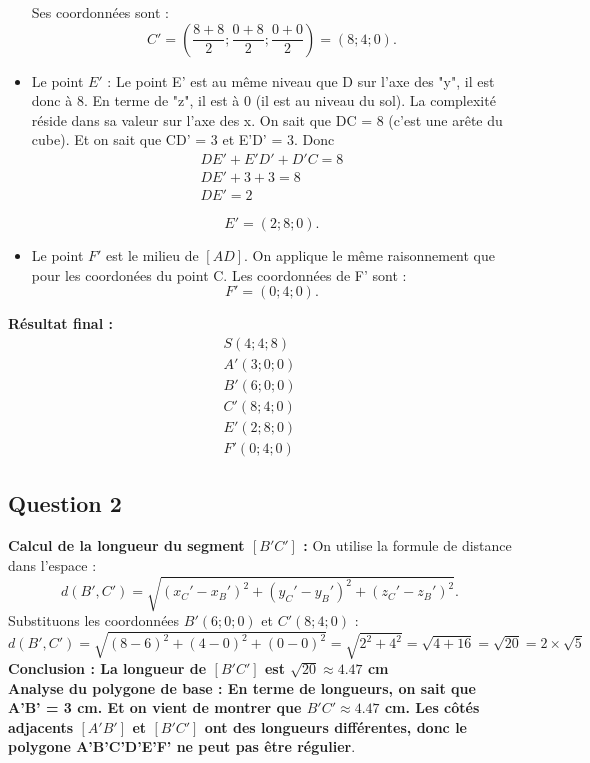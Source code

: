 \documentclass{exam}
\begin{document}
\begin{itemize}[noitemsep]
  Ses coordonnées sont :
  \[
  C' = \left(\frac{8 + 8}{2}; \frac{0 + 8}{2}; \frac{0 + 0}{2}\right) = (8; 4; 0).
  \]

  \item Le point \(E'\) : Le point E' est au même niveau que D sur l'axe des "y", il est donc à 8. En terme de "z", il est à 0 (il est au niveau du sol). La complexité réside dans sa valeur sur l'axe des x. On sait que DC = 8 (c'est une arête du cube). Et on sait que CD' = 3 et E'D' = 3.
  Donc
  \begin{align*}
    DE' + E'D' + D'C = 8 \\
    DE' + 3 + 3 = 8 \\
    DE' = 2
    \end{align*} 

  \[
  E' = (2; 8; 0).
  \]

  \item Le point \(F'\) est le milieu de \([AD]\). On applique le même raisonnement que pour les coordonées du point C. Les coordonnées de F' sont :
  \[
  F' = (0; 4; 0).
  \]
\end{itemize}

\textbf{Résultat final :} 
\begin{align*}
  S(4; 4; 8) \\
  A'(3; 0; 0) \\
  B'(6; 0; 0) \\
  C'(8; 4; 0) \\
  E'(2; 8; 0) \\
  F'(0; 4; 0)
\end{align*} 

\subsection*{Question 2}

\textbf{Calcul de la longueur du segment \([B'C']\) :} On utilise la formule de distance dans l’espace :
\[
d(B', C') = \sqrt{(x_C' - x_B')^2 + (y_C' - y_B')^2 + (z_C' - z_B')^2}.
\]
Substituons les coordonnées \(B'(6; 0; 0)\) et \(C'(8; 4; 0)\) :
\[
d(B', C') = \sqrt{(8 - 6)^2 + (4 - 0)^2 + (0 - 0)^2} = \sqrt{2^2 + 4^2} = \sqrt{4 + 16} = \sqrt{20} = 2 \times \sqrt{5}
\]
\vspace{1em}
\textbf{Conclusion : La longueur de \([B'C']\) est \(\sqrt{20} \approx 4.47\) cm} \\
\vspace{1em}
\textbf{Analyse du polygone de base : En terme de longueurs, on sait que A'B' = 3 cm. Et on vient de montrer que \(B'C' \approx 4.47\) cm. Les côtés adjacents \([A'B']\) et \([B'C']\) ont des longueurs différentes, donc le polygone A'B'C'D'E'F' ne peut pas être régulier}.  
\vspace{1em}
\end{document}
